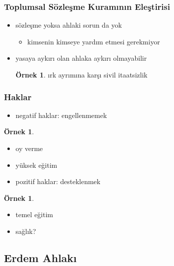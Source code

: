 \documentclass[dvipsnames]{beamer}
\theoremstyle{definition}
\theoremstyle{example}
\newtheorem{ornek}[theorem]{Örnek}
\theoremstyle{plain}
\begin{document}
\begin{frame}
  \frametitle{Toplumsal Sözleşme Kuramının Eleştirisi}

  \begin{itemize}
    \item sözleşme yoksa ahlaki sorun da yok

    \begin{itemize}
      \item kimsenin kimseye yardım etmesi gerekmiyor
    \end{itemize}

    \pause
    \item yasaya aykırı olan ahlaka aykırı olmayabilir

    \begin{ornek}
      ırk ayrımına karşı sivil itaatsizlik
    \end{ornek}
  \end{itemize}
\end{frame}

\begin{frame}
  \frametitle{Haklar}

  \begin{itemize}
    \item \alert{negatif haklar}: engellenmemek
  \end{itemize}

  \begin{ornek}
    \begin{itemize}
      \item oy verme
      \item yüksek eğitim
    \end{itemize}
  \end{ornek}

  \pause
  \begin{itemize}
    \item \alert{pozitif haklar}: desteklenmek
  \end{itemize}

  \begin{ornek}
    \begin{itemize}
      \item temel eğitim
      \item sağlık?
    \end{itemize}
  \end{ornek}
\end{frame}

\subsection{Erdem Ahlakı}
\end{document}
